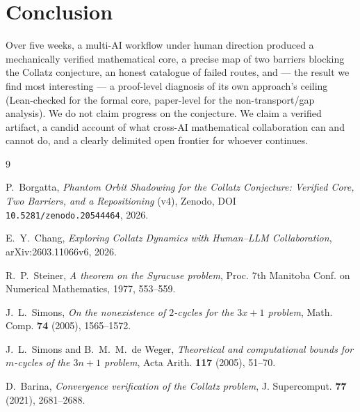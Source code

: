 \documentclass[11pt,a4paper]{article}
\theoremstyle{definition}
\begin{document}
\section{Conclusion}
\label{sec:conclusion}

Over five weeks, a multi-AI workflow under human direction produced a mechanically
verified mathematical core, a precise map of two barriers blocking the
Collatz conjecture, an honest catalogue of failed routes, and --- the result
we find most interesting --- a proof-level diagnosis of its own approach's
ceiling (Lean-checked for the formal core, paper-level for the
non-transport/gap analysis). We do not claim progress on the conjecture. We
claim a verified artifact, a candid account of what cross-AI mathematical
collaboration can and cannot do, and a clearly delimited open frontier for
whoever continues.

\begin{thebibliography}{9}

P.~Borgatta, \emph{Phantom Orbit Shadowing for the Collatz Conjecture:
Verified Core, Two Barriers, and a Repositioning} (v4), Zenodo, DOI
\texttt{10.5281/zenodo.20544464}, 2026.

E.~Y.~Chang, \emph{Exploring Collatz Dynamics with Human--LLM
Collaboration}, arXiv:2603.11066v6, 2026.

R.~P.~Steiner, \emph{A theorem on the Syracuse problem}, Proc. 7th Manitoba
Conf. on Numerical Mathematics, 1977, 553--559.

J.~L.~Simons, \emph{On the nonexistence of $2$-cycles for the $3x+1$ problem},
Math. Comp. \textbf{74} (2005), 1565--1572.

J.~L.~Simons and B.~M.~M.~de Weger, \emph{Theoretical and computational bounds
for $m$-cycles of the $3n+1$ problem}, Acta Arith. \textbf{117} (2005), 51--70.

D.~Barina, \emph{Convergence verification of the Collatz problem},
J. Supercomput. \textbf{77} (2021), 2681--2688.

\end{thebibliography}
\end{document}
